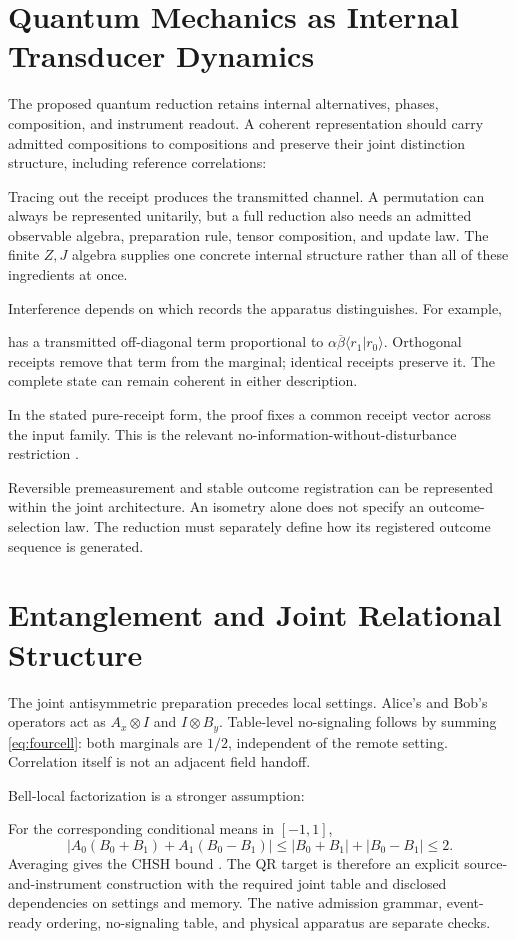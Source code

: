 \section{Quantum Mechanics as Internal Transducer Dynamics}\label{sec:quantum}
The proposed quantum reduction retains internal alternatives, phases, composition, and instrument readout. A coherent representation should carry admitted compositions to compositions and preserve their joint distinction structure, including reference correlations:

Tracing out the receipt produces the transmitted channel. A permutation can always be represented unitarily, but a full reduction also needs an admitted observable algebra, preparation rule, tensor composition, and update law. The finite $Z,J$ algebra supplies one concrete internal structure rather than all of these ingredients at once.

Interference depends on which records the apparatus distinguishes. For example,

has a transmitted off-diagonal term proportional to $\alpha\overline\beta\langle r_1|r_0\rangle$. Orthogonal receipts remove that term from the marginal; identical receipts preserve it. The complete state can remain coherent in either description.


In the stated pure-receipt form, the proof fixes a common receipt vector across the input family. This is the relevant no-information-without-disturbance restriction \citep{watrous2018,wootterszurek1982}.

Reversible premeasurement and stable outcome registration can be represented within the joint architecture. An isometry alone does not specify an outcome-selection law. The reduction must separately define how its registered outcome sequence is generated.

\section{Entanglement and Joint Relational Structure}\label{sec:entanglement}
The joint antisymmetric preparation precedes local settings. Alice's and Bob's operators act as $A_x\otimes I$ and $I\otimes B_y$. Table-level no-signaling follows by summing \eqref{eq:fourcell}: both marginals are $1/2$, independent of the remote setting. Correlation itself is not an adjacent field handoff.

Bell-local factorization is a stronger assumption:

For the corresponding conditional means in $[-1,1]$,
\[
|A_0(B_0+B_1)+A_1(B_0-B_1)|
\leq |B_0+B_1|+|B_0-B_1|\leq2.
\]
Averaging gives the CHSH bound \citep{chsh1969}. The QR target is therefore an explicit source-and-instrument construction with the required joint table and disclosed dependencies on settings and memory. The native admission grammar, event-ready ordering, no-signaling table, and physical apparatus are separate checks.
